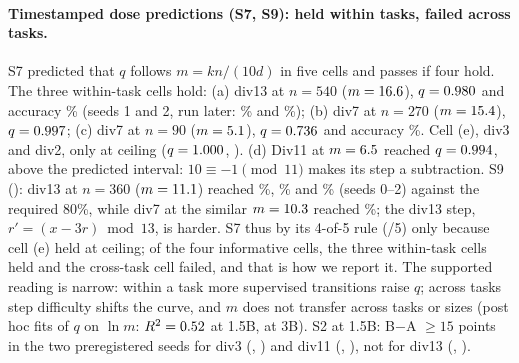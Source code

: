 \documentclass{article}
\theoremstyle{definition}
\begin{document}
\paragraph{Timestamped dose predictions (S7, S9): held within tasks, failed across tasks.} S7 predicted that $q$ follows $m=kn/(10d)$ in five cells and passes if four hold. The three within-task cells hold: (a) div13 at $n=540$ ($m=16.6$), $q=0.980$ and accuracy \divthirteenBnFiveFortysZero\% (seeds 1 and 2, run later: \divthirteenBnFiveFortysOne\% and \divthirteenBnFiveFortysTwo\%); (b) div7 at $n=270$ ($m=15.4$), $q=0.997$; (c) div7 at $n=90$ ($m=5.1$), $q=0.736$ and accuracy \divsevenBnNinetysZero\%. Cell (e), div3 and div2, \SsevenCellE{} only at ceiling ($q=1.000$, \pDivtwo). (d) Div11 at $m=6.5$ reached $q=0.994$, above the predicted interval: $10\equiv-1\pmod{11}$ makes its step a subtraction. S9 (\verdictSNine): div13 at $n=360$ ($m=11.1$) reached \divthirteenBnThreeSixtysZero\%, \divthirteenBnThreeSixtysOne\% and \divthirteenBnThreeSixtysTwo\% (seeds 0--2) against the required 80\%, while div7 at the similar $m=10.3$ reached \divsevenBnOneEighty\%; the div13 step, $r'=(x-3r)\bmod 13$, is harder. S7 thus \verdictSSeven{} by its 4-of-5 rule (\SsevenHeld/5) only because cell (e) held at ceiling; of the four informative cells, the three within-task cells held and the cross-task cell failed, and that is how we report it. The supported reading is narrow: within a task more supervised transitions raise $q$; across tasks step difficulty shifts the curve, and $m$ does not transfer across tasks or sizes (post hoc fits of $q$ on $\ln m$: $R^2=0.52$ at 1.5B, \fitRsqThreeB{} at 3B). S2 \verdictSTwo{} at 1.5B: B$-$A $\ge 15$ points in the two preregistered seeds for div3 (\divthreeBAdZero, \divthreeBAdOne) and div11 (\divelevenBAdZero, \divelevenBAdOne), not for div13 (\divthirteenBAdZero, \divthirteenBAdOne).
\end{document}
